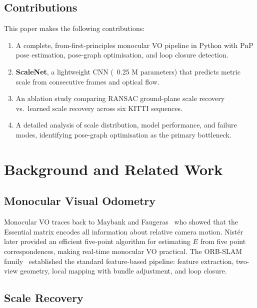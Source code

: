 \documentclass[12pt,a4paper]{article}
\begin{document}
\subsection{Contributions}

This paper makes the following contributions:

\begin{enumerate}
    \item A complete, from-first-principles monocular VO pipeline in Python with PnP pose estimation, pose-graph optimisation, and loop closure detection.
    \item \textbf{ScaleNet}, a lightweight CNN (~0.25 M parameters) that predicts metric scale from consecutive frames and optical flow.
    \item An ablation study comparing RANSAC ground-plane scale recovery vs.\ learned scale recovery across six KITTI sequences.
    \item A detailed analysis of scale distribution, model performance, and failure modes, identifying pose-graph optimisation as the primary bottleneck.
\end{enumerate}

\section{Background and Related Work}

\subsection{Monocular Visual Odometry}

Monocular VO traces back to Maybank and Faugeras~\cite{Maybank92} who showed that the Essential matrix encodes all information about relative camera motion. Nist\'er~\cite{Nister04} later provided an efficient five-point algorithm for estimating $E$ from five point correspondences, making real-time monocular VO practical. The ORB-SLAM family~\cite{ORB-SLAM, ORB-SLAM2} established the standard feature-based pipeline: feature extraction, two-view geometry, local mapping with bundle adjustment, and loop closure.

\subsection{Scale Recovery}
\end{document}
